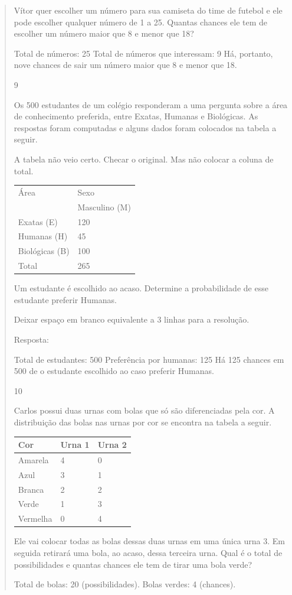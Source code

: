 \begin{mdframed}[linewidth=2pt,linecolor=salmao,roundcorner=2pt]
\begin{itemize}
{\begin{itemize}
\begin{escolha}
{\begin{quote}
{\begin{escolha}
{Vítor quer escolher um número para sua camiseta do time de futebol e ele
pode escolher qualquer número de 1 a 25. Quantas chances ele tem de
escolher um número maior que 8 e menor que 18?

Total de números: 25
Total de números que interessam: 9
Há, portanto, nove chances de sair um número maior que 8 e menor que 18.

\num{9}

Os 500 estudantes de um colégio responderam a uma pergunta sobre a
área de conhecimento preferida, entre Exatas, Humanas e
Biológicas. As respostas foram computadas e alguns dados foram colocados
na tabela a seguir.

\Paulo A tabela não veio certo. Checar o original. Mas não colocar a coluna de total.
\begin{longtable}[]{@{}ll@{}}
\toprule
Área & Sexo\tabularnewline
& Masculino (M)\tabularnewline
Exatas (E) & 120\tabularnewline
Humanas (H) & 45\tabularnewline
Biológicas (B) & 100\tabularnewline
Total & 265\tabularnewline
\bottomrule
\end{longtable}

Um estudante é escolhido ao acaso. Determine a probabilidade de esse
estudante preferir Humanas.

Deixar espaço em branco equivalente a 3 linhas para a resolução.

Resposta:

Total de estudantes: 500
Preferência por humanas: 125
Há 125 chances em 500 de o estudante escolhido ao caso preferir Humanas.

\num{10}

Carlos possui duas urnas com bolas que só são diferenciadas pela cor. A
distribuição das bolas nas urnas por cor se encontra na tabela a
seguir.

\begin{longtable}[]{@{}lll@{}}
\toprule
Cor & Urna 1 & Urna 2\tabularnewline
\midrule
\endhead
Amarela & 4 & 0\tabularnewline
Azul & 3 & 1\tabularnewline
Branca & 2 & 2\tabularnewline
Verde & 1 & 3\tabularnewline
Vermelha & 0 & 4\tabularnewline
\bottomrule
\end{longtable}

Ele vai colocar todas as bolas dessas duas urnas em uma única urna 3. Em
seguida retirará uma bola, ao acaso, dessa terceira urna. Qual é o total de possibilidades e quantas chances ele tem de tirar uma bola verde?

Total de bolas: 20 (possibilidades).
Bolas verdes: 4 (chances).


}
\end{escolha}}
\end{quote}}
\end{escolha}
\end{itemize}}
\end{itemize}
\end{mdframed}
